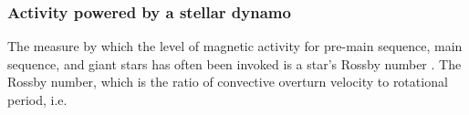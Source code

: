 \documentclass[]{aastex631}
\begin{document}
\subsubsection{Activity powered by a stellar dynamo}


%

%
The measure by which the level of magnetic activity for pre-main sequence, main sequence, and giant stars has often been invoked is a star's Rossby number \citep{Preibisch+2005, Pizzolato+2003, Gondoin+2005}.
The Rossby number, which is the ratio of convective overturn velocity to rotational period, i.e.
\end{document}
